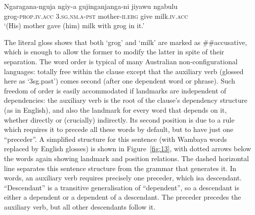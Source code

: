 \documentclass[output=paper]{langscibook}
\begin{document}
\begin{exe}
	\ex \label{ex:19}
	\gll Ngaragana-nguja ngiy-a gujinganjanga-ni jiyawu ngabulu\\
	grog\textsc{-prop}.\textsc{iv}.\textsc{acc} 3.\textsc{sg}.\textsc{nm}.\textsc{a}-\textsc{pst} mother-\textsc{ii}.\textsc{erg} give milk.\textsc{iv}.\textsc{acc}\\
	\glt ‘(His) mother gave (him) milk with grog in it.’
\end{exe}

The literal gloss shows that both ‘grog’ and ‘milk’ are marked as \#\#accusative, which is enough to allow the former to modify the latter in spite of their separation. The word order is typical of many Australian non-configurational languages: totally free within the clause except that the auxiliary verb (glossed here as ‘3sg.past’) comes second (after one dependent word or phrase). Such freedom of order is easily accommodated if landmarks are independent of dependencies: the auxiliary verb is the root of the clause’s dependency structure (as in English), and also the landmark for every word that depends on it, whether directly or (crucially) indirectly. Its second position is due to a rule which requires it to precede all these words by default, but to have just one ``preceder''. A simplified structure for this sentence (with Wambaya words replaced by English glosses) is shown in Figure~\ref{fig:13}, with dotted arrows below the words again showing landmark and position relations. The dashed horizontal line separates this sentence structure from the grammar that generates it. In words, an auxiliary verb requires precisely one preceder, which isa descendant. ``Descendant'' is a transitive generalisation of ``dependent'', so a descendant is either a dependent or a dependent of a descendant. The preceder precedes the auxiliary verb, but all other descendants follow it.
\end{document}
